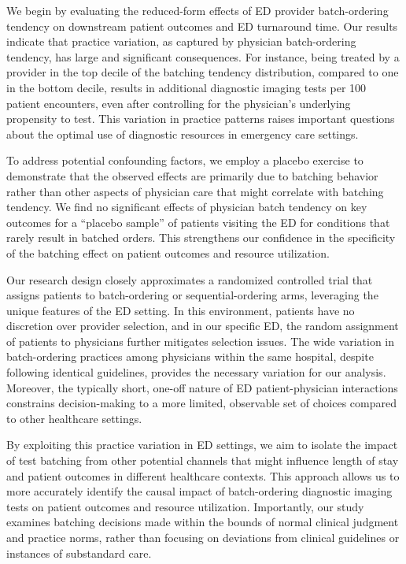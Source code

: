 \documentclass[,,nonblindrev]{informs}
\begin{document}
We begin by evaluating the reduced-form effects of ED provider
batch-ordering tendency on downstream patient outcomes and ED turnaround
time. Our results indicate that practice variation, as captured by
physician batch-ordering tendency, has large and significant
consequences. For instance, being treated by a provider in the top
decile of the batching tendency distribution, compared to one in the
bottom decile, results in additional diagnostic imaging tests per 100
patient encounters, even after controlling for the physician's
underlying propensity to test. This variation in practice patterns
raises important questions about the optimal use of diagnostic resources
in emergency care settings.

To address potential confounding factors, we employ a placebo exercise
to demonstrate that the observed effects are primarily due to batching
behavior rather than other aspects of physician care that might
correlate with batching tendency. We find no significant effects of
physician batch tendency on key outcomes for a ``placebo sample'' of
patients visiting the ED for conditions that rarely result in batched
orders. This strengthens our confidence in the specificity of the
batching effect on patient outcomes and resource utilization.

Our research design closely approximates a randomized controlled trial
that assigns patients to batch-ordering or sequential-ordering arms,
leveraging the unique features of the ED setting. In this environment,
patients have no discretion over provider selection, and in our specific
ED, the random assignment of patients to physicians further mitigates
selection issues. The wide variation in batch-ordering practices among
physicians within the same hospital, despite following identical
guidelines, provides the necessary variation for our analysis. Moreover,
the typically short, one-off nature of ED patient-physician interactions
constrains decision-making to a more limited, observable set of choices
compared to other healthcare settings.

By exploiting this practice variation in ED settings, we aim to isolate
the impact of test batching from other potential channels that might
influence length of stay and patient outcomes in different healthcare
contexts. This approach allows us to more accurately identify the causal
impact of batch-ordering diagnostic imaging tests on patient outcomes
and resource utilization. Importantly, our study examines batching
decisions made within the bounds of normal clinical judgment and
practice norms, rather than focusing on deviations from clinical
guidelines or instances of substandard care.
\end{document}
